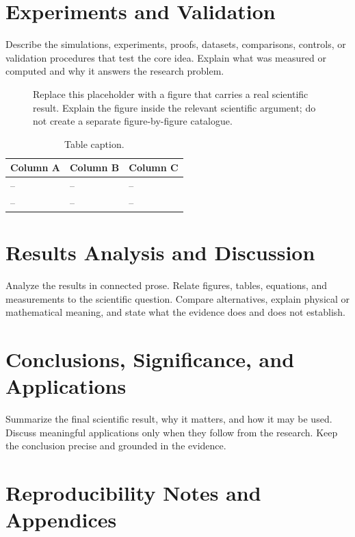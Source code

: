 \documentclass[11pt,a4paper]{article}
\begin{document}
\section{Experiments and Validation}

Describe the simulations, experiments, proofs, datasets, comparisons, controls,
or validation procedures that test the core idea. Explain what was measured or
computed and why it answers the research problem.

\begin{figure}[htbp]
\centering
\fbox{\rule{0pt}{1.8in}\rule{0.85\textwidth}{0pt}}
\caption{Replace this placeholder with a figure that carries a real scientific
result. Explain the figure inside the relevant scientific argument; do not
create a separate figure-by-figure catalogue.}
\label{fig:report-example}
\end{figure}

\begin{table}[htbp]
\caption{Table caption.}
\label{tab:report-example}
\begin{tabularx}{\textwidth}{YYY}
\toprule
Column A & Column B & Column C \\
\midrule
-- & -- & -- \\
-- & -- & -- \\
\bottomrule
\end{tabularx}
\end{table}

\section{Results Analysis and Discussion}

Analyze the results in connected prose. Relate figures, tables, equations, and
measurements to the scientific question. Compare alternatives, explain physical
or mathematical meaning, and state what the evidence does and does not establish.

\section{Conclusions, Significance, and Applications}

Summarize the final scientific result, why it matters, and how it may be used.
Discuss meaningful applications only when they follow from the research. Keep
the conclusion precise and grounded in the evidence.

\appendix
\section{Reproducibility Notes and Appendices}
\end{document}
